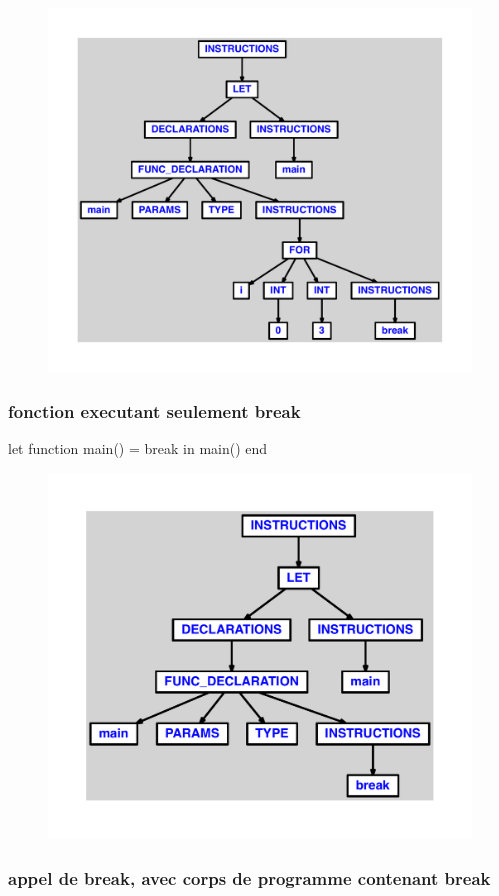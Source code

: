 \documentclass{article}
\begin{document}
\begin{figure}[H]\centering\includegraphics[max width=\textwidth]{ast/ast_10.pdf}\end{figure}\subsubsection{fonction executant seulement break}
\begin{verbatimtab}
let
	function main() = break
in main() end
\end{verbatimtab}
\begin{figure}[H]\centering\includegraphics[max width=\textwidth]{ast/ast_11.pdf}\end{figure}\subsubsection{appel de break, avec corps de programme contenant break}
\end{document}
